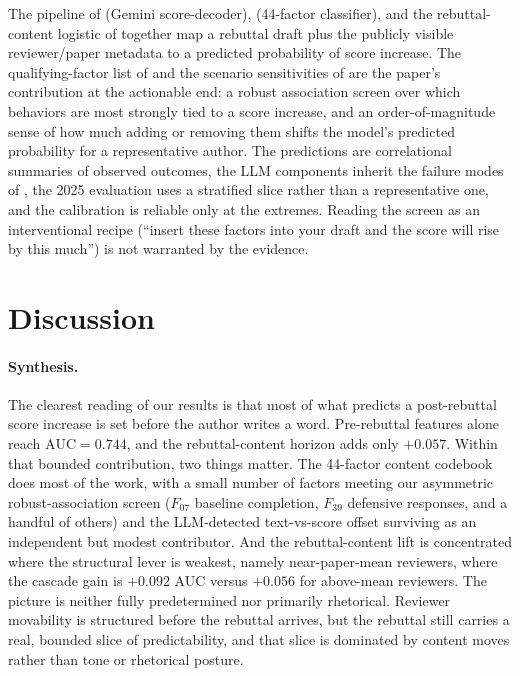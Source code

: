 \documentclass{article}
\newcommand{\auc}{\text{AUC}}
\begin{document}
The pipeline of  (Gemini score-decoder),  (44-factor classifier), and the rebuttal-content logistic of  together map a rebuttal draft plus the publicly visible reviewer/paper metadata to a predicted probability of score increase. The qualifying-factor list of  and the scenario sensitivities of  are the paper's contribution at the actionable end: a robust association screen over which behaviors are most strongly tied to a score increase, and an order-of-magnitude sense of how much adding or removing them shifts the model's predicted probability for a representative author. The predictions are correlational summaries of observed outcomes, the LLM components inherit the failure modes of , the 2025 evaluation uses a stratified slice rather than a representative one, and the calibration is reliable only at the extremes. Reading the screen as an interventional recipe (``insert these factors into your draft and the score will rise by this much'') is not warranted by the evidence.

\section{Discussion}\label{sec:discussion}

\paragraph{Synthesis.} The clearest reading of our results is that most of what predicts a post-rebuttal score increase is set before the author writes a word. Pre-rebuttal features alone reach $\auc = 0.744$, and the rebuttal-content horizon adds only $+0.057$. Within that bounded contribution, two things matter. The 44-factor content codebook does most of the work, with a small number of factors meeting our asymmetric robust-association screen ($F_{07}$ baseline completion, $F_{39}$ defensive responses, and a handful of others) and the LLM-detected text-vs-score offset surviving as an independent but modest contributor. And the rebuttal-content lift is concentrated where the structural lever is weakest, namely near-paper-mean reviewers, where the cascade gain is $+0.092$ AUC versus $+0.056$ for above-mean reviewers. The picture is neither fully predetermined nor primarily rhetorical. Reviewer movability is structured before the rebuttal arrives, but the rebuttal still carries a real, bounded slice of predictability, and that slice is dominated by content moves rather than tone or rhetorical posture.
\end{document}
